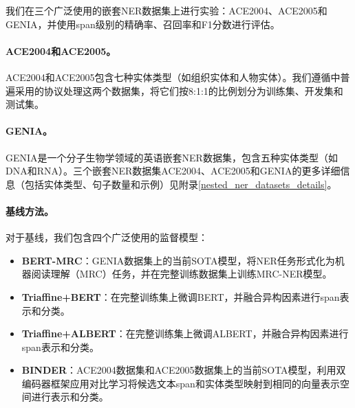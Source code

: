 \documentclass[supercite]{Experimental_Report}
\theoremstyle{definition}
\begin{document}
我们在三个广泛使用的嵌套NER数据集上进行实验：ACE2004、ACE2005和GENIA，并使用span级别的精确率、召回率和F1分数进行评估。

\paragraph{ACE2004和ACE2005。}
ACE2004\cite{doddington2004automatic}和ACE2005\cite{christopher2006ace}包含七种实体类型（如组织实体和人物实体）。我们遵循\cite{katiyar2018nested}中普遍采用的协议处理这两个数据集，将它们按8:1:1的比例划分为训练集、开发集和测试集。

\paragraph{GENIA。}
GENIA\cite{ohta2002genia}是一个分子生物学领域的英语嵌套NER数据集，包含五种实体类型（如DNA和RNA）。三个嵌套NER数据集ACE2004、ACE2005和GENIA的更多详细信息（包括实体类型、句子数量和示例）见附录\ref{nested_ner_datasets_details}。

\paragraph{基线方法。}对于基线，我们包含四个广泛使用的监督模型：
\begin{itemize}
\item \textbf{BERT-MRC}\cite{li2019unified}：GENIA数据集上的当前SOTA模型，将NER任务形式化为机器阅读理解（MRC）任务，并在完整训练数据集上训练MRC-NER模型。
\item \textbf{Triaffine+BERT}\cite{yuan2021fusing}：在完整训练集上微调BERT\cite{devlin2018bert}，并融合异构因素进行span表示和分类。
\item \textbf{Triaffine+ALBERT}\cite{yuan2021fusing}：在完整训练集上微调ALBERT\cite{lan2019albert}，并融合异构因素进行span表示和分类。
\item \textbf{BINDER}\cite{zhang2022optimizing}：ACE2004数据集和ACE2005数据集上的当前SOTA模型，利用双编码器框架应用对比学习将候选文本span和实体类型映射到相同的向量表示空间进行表示和分类。
\end{itemize}
\end{document}
